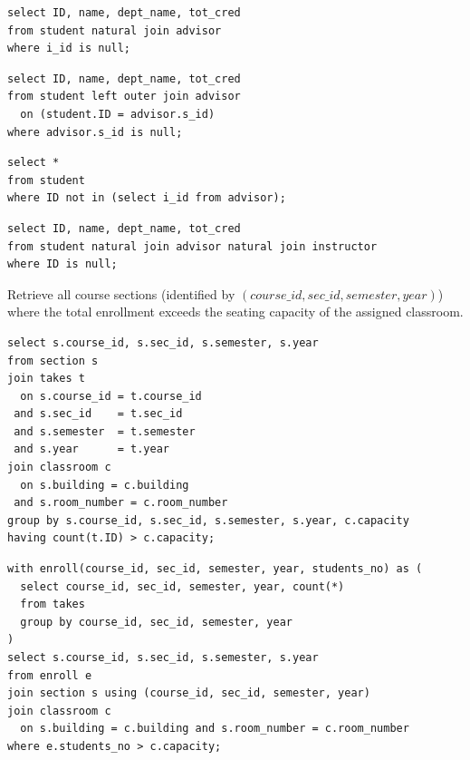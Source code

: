 \documentclass[12pt]{exam}
\begin{document}
\begin{questions}
\begin{choices}
  \choice
\begin{verbatim}
select ID, name, dept_name, tot_cred
from student natural join advisor
where i_id is null;
\end{verbatim}

  \CorrectChoice
\begin{verbatim}
select ID, name, dept_name, tot_cred
from student left outer join advisor
  on (student.ID = advisor.s_id)
where advisor.s_id is null;
\end{verbatim}

  \choice
\begin{verbatim}
select *
from student
where ID not in (select i_id from advisor);
\end{verbatim}

  \choice
\begin{verbatim}
select ID, name, dept_name, tot_cred
from student natural join advisor natural join instructor
where ID is null;
\end{verbatim}

\end{choices}

\question[4] Retrieve all course sections (identified by \((\mathit{course\_id}, \mathit{sec\_id}, \mathit{semester}, \mathit{year})\)) where the total enrollment exceeds the seating capacity of the assigned classroom.

\begin{choices}

  \CorrectChoice
\begin{verbatim}
select s.course_id, s.sec_id, s.semester, s.year
from section s
join takes t
  on s.course_id = t.course_id
 and s.sec_id    = t.sec_id
 and s.semester  = t.semester
 and s.year      = t.year
join classroom c
  on s.building = c.building
 and s.room_number = c.room_number
group by s.course_id, s.sec_id, s.semester, s.year, c.capacity
having count(t.ID) > c.capacity;
\end{verbatim}

  \CorrectChoice
\begin{verbatim}
with enroll(course_id, sec_id, semester, year, students_no) as (
  select course_id, sec_id, semester, year, count(*)
  from takes
  group by course_id, sec_id, semester, year
)
select s.course_id, s.sec_id, s.semester, s.year
from enroll e
join section s using (course_id, sec_id, semester, year)
join classroom c
  on s.building = c.building and s.room_number = c.room_number
where e.students_no > c.capacity;
\end{verbatim}


\end{choices}
\end{questions}
\end{document}
